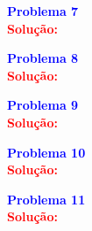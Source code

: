 \documentclass[a4paper,12pt]{article}
\newcommand{\printingbibliography}{%

    \pagestyle{myheadings}
    \markright{}
    \sloppy
    \printbibliography[heading=bibintoc, %
                   title=Refer\^encias %
                  ]
    \fussy%
}
\begin{document}
\begin{flushleft}
\textbf{\textcolor{blue}{\Large Problema 7}}\\

\textcolor{red}{\textbf{Solução:}}\\
\end{flushleft}

\begin{flushleft}
\textbf{\textcolor{blue}{\Large Problema 8}}\\

\textcolor{red}{\textbf{Solução:}}\\
\end{flushleft}

\begin{flushleft}
\textbf{\textcolor{blue}{\Large Problema 9}}\\

\textcolor{red}{\textbf{Solução:}}\\
\end{flushleft}

\begin{flushleft}
\textbf{\textcolor{blue}{\Large Problema 10}}\\

\textcolor{red}{\textbf{Solução:}}\\
\end{flushleft}


\begin{flushleft}
\textbf{\textcolor{blue}{\Large Problema 11}}\\

\textcolor{red}{\textbf{Solução:}}\\
\end{flushleft}



\end{document}
